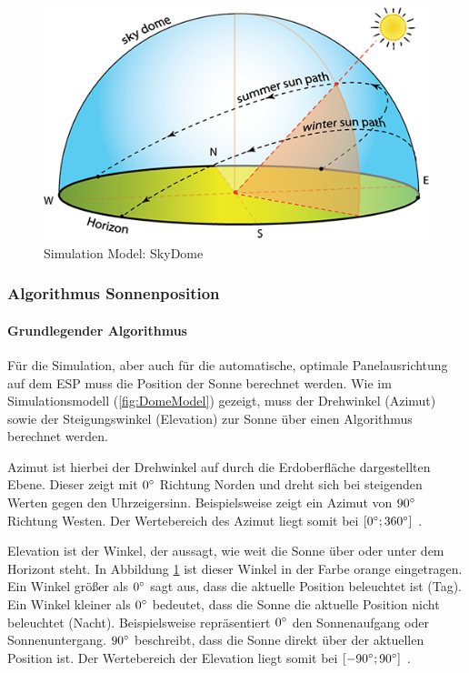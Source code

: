 \begin{figure}[htpb] %
    \centering
    \includegraphics[width=\textwidth,keepaspectratio=true]{pics/SkyDomeModel.png}
    \caption{Simulation Model: SkyDome \autocite{front:SkyDome:img}}
    \label{fig:DomeModel}
\end{figure}

\subsubsection{Algorithmus Sonnenposition}

\paragraph{Grundlegender Algorithmus}

Für die Simulation, aber auch für die automatische, optimale Panelausrichtung auf dem ESP muss die Position der Sonne berechnet werden.
Wie im Simulationsmodell (\autoref{fig:DomeModel}) gezeigt, muss der Drehwinkel (Azimut) sowie der Steigungswinkel (Elevation) zur Sonne über einen Algorithmus berechnet werden.

Azimut ist hierbei der Drehwinkel auf durch die Erdoberfläche dargestellten Ebene.
Dieser zeigt mit $0\degree$ Richtung Norden und dreht sich bei steigenden Werten gegen den Uhrzeigersinn. Beispielsweise zeigt ein Azimut von $90\degree$ Richtung Westen. Der Wertebereich des Azimut liegt somit bei $[0\degree; 360\degree]$ \autocite{front:AzimuthAngle}.

Elevation ist der Winkel, der aussagt, wie weit die Sonne über oder unter dem Horizont steht. In Abbildung \ref{fig:DomeModel} ist dieser Winkel in der Farbe orange eingetragen.
Ein Winkel größer als $0\degree$ sagt aus, dass die aktuelle Position beleuchtet ist (Tag). Ein Winkel kleiner als $0\degree$ bedeutet, dass die Sonne die aktuelle Position nicht beleuchtet (Nacht).
Beispielsweise repräsentiert $0\degree$ den Sonnenaufgang oder Sonnenuntergang.
$90\degree$ beschreibt, dass die Sonne direkt über der aktuellen Position ist.
Der Wertebereich der Elevation liegt somit bei $[-90\degree; 90\degree]$ \autocite{front:ElevationAngle}.

